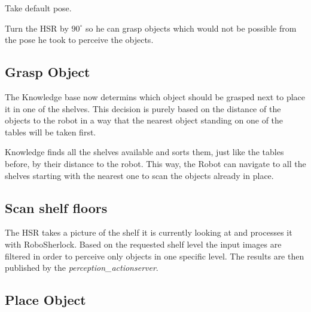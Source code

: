 \documentclass[main.tex]{subfiles}
\begin{document}
	Take default pose.
	
	
	
	Turn the HSR by $90^\circ$ so he can grasp objects which would not be possible from the pose he took to perceive the objects.
	
	\subsection{Grasp Object}
	
	The Knowledge base now determins which object should be grasped next to place it in one of the shelves. This decision is purely based on the distance of the objects to the robot in a way that the nearest object standing on one of the tables will be taken first.
	
	
	
	
	
Knowledge finds all the shelves available and sorts them, just like the tables before, by their distance to the robot. This way, the Robot can navigate to all the shelves starting with the nearest one to scan the objects already in place.
	
	
	\subsection{Scan shelf floors}
	
	
	
	
	The HSR takes a picture of the shelf it is currently looking at and processes it with RoboSherlock. Based on the requested shelf level the input images are filtered in order to perceive only objects in one specific level. The results are then published by the \textit{perception\_actionserver}.
	
	
	\subsection{Place Object}
	
\end{document}
